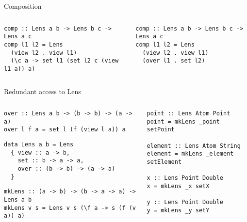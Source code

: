\documentclass[presentation,aspectratio=169,8pt]{beamer}
\begin{document}
\begin{frame}[label={sec:org1fa2b7e},fragile]{Composition}
 \begin{columns}
\begin{column}{0.5\columnwidth}
\begin{verbatim}
comp :: Lens a b -> Lens b c -> Lens a c
comp l1 l2 = Lens
  (view l2 . view l1)
  (\c a -> set l1 (set l2 c (view l1 a)) a)
\end{verbatim}
\end{column}

\begin{column}{0.5\columnwidth}
\begin{verbatim}
comp :: Lens a b -> Lens b c -> Lens a c
comp l1 l2 = Lens
  (view l2 . view l1)
  (over l1 . set l2)
\end{verbatim}
\end{column}
\end{columns}
\end{frame}

\begin{frame}[label={sec:org77b305e},fragile]{Redundant access to Lens}
 \begin{columns}
\begin{column}{0.5\columnwidth}
\begin{verbatim}
over :: Lens a b -> (b -> b) -> (a -> a)
over l f a = set l (f (view l a)) a
\end{verbatim}

\pause

\begin{verbatim}
data Lens a b = Lens
  { view :: a -> b,
    set :: b -> a -> a,
    over :: (b -> b) -> (a -> a)
  }
\end{verbatim}

\pause

\begin{verbatim}
mkLens :: (a -> b) -> (b -> a -> a) -> Lens a b
mkLens v s = Lens v s (\f a -> s (f (v a)) a)
\end{verbatim}
\end{column}

\begin{column}{0.5\columnwidth}
\pause

\begin{verbatim}
point :: Lens Atom Point
point = mkLens _point setPoint

element :: Lens Atom String
element = mkLens _element setElement

x :: Lens Point Double
x = mkLens _x setX

y :: Lens Point Double
y = mkLens _y setY
\end{verbatim}
\end{column}
\end{columns}
\end{frame}
\end{document}
